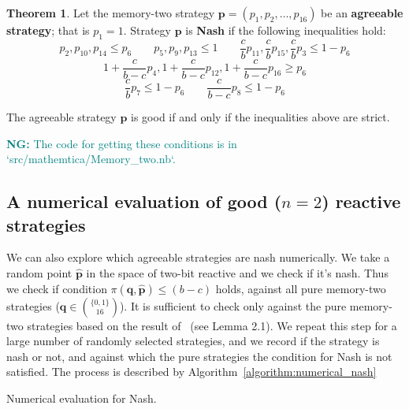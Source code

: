 \documentclass{article}
\theoremstyle{definition}
\newtheorem{theorem}{Theorem}[section]
\newcommand{\nikoleta}[1]{\textcolor{teal}{{\bf NG:} #1}}
\begin{document}
\begin{theorem}\label{theorem:memory_two_nash_and_good}
  Let the memory-two strategy \(\mathbf{p} = (p_{1}, p_{2}, \dots, p_{16})\) be an \textbf{agreeable
  strategy}; that is \(p_1 = 1\). Strategy \(\mathbf{p}\) is \textbf{Nash} if the
  following inequalities hold:
  \begin{equation*}
      p_2, p_{10}, p_{14}  \leq  p_{6}  \qquad  p_5, p_9, p_{13}  \leq 1 \qquad  \frac{c}{b} p_{11}, \frac{c}{b} p_{15}, \frac{c}{b} p_{3} \leq 1 - p_{6}
  \end{equation*}
  \begin{equation*}
    1 + \frac{c}{b - c} p_{4}, 1 + \frac{c}{b - c} p_{12}, 1 + \frac{c}{b - c} p_{16} \geq p_6
  \end{equation*}
  \begin{equation*}
        \frac{c}{b} p_{7} \leq 1 - p_6  \qquad \frac{c}{b -c} p_{8} \leq 1 - p_6
  \end{equation*}

  The agreeable strategy \(\mathbf{p}\) is good if and only if the inequalities above are strict.
\end{theorem}

\nikoleta{The code for getting these conditions is in `src/mathemtica/Memory\_two.nb`.}

\subsection{A numerical evaluation of good (\(n=2\)) reactive strategies}\label{section:good_strategies_numerically}

We can also explore which agreeable strategies are nash numerically. We take a
random point \(\hat{\mathbf{p}}\) in the space of two-bit reactive and we check
if it's nash. Thus we check if condition \(\pi({\mathbf{q}}, \hat{\mathbf{p}})
\leq (b - c)\) holds, against all pure memory-two strategies (\(\mathbf{q} \in
\binom{\{0, 1\}}{16}\)). It is sufficient to check only against the pure
memory-two strategies based on the result of~\citep{mcavoy:PRSA:2019} (see Lemma
2.1). We repeat this step for a large number of randomly selected strategies,
and we record if the strategy is nash or not, and against which the pure
strategies the condition for Nash is not satisfied. The process is described by
Algorithm~\ref{algorithm:numerical_nash}

\begin{algorithm}[H]
  \SetAlgoLined {}
  \caption{Numerical evaluation for Nash.}\label{algorithm:numerical_nash}
\end{algorithm}
\end{document}

